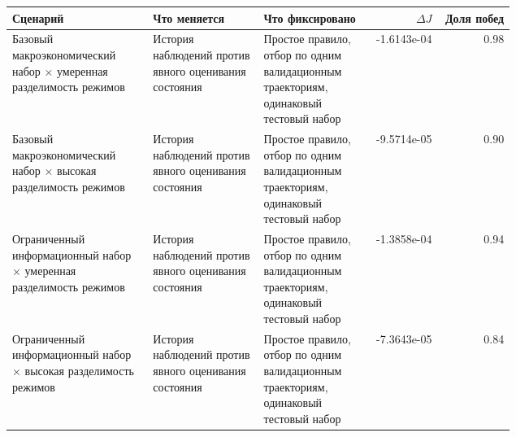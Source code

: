 \begin{tabular}{p{0.28\linewidth}p{0.22\linewidth}p{0.22\linewidth}rr}
\toprule
Сценарий & Что меняется & Что фиксировано & $\Delta J$ & Доля побед \\
\midrule
Базовый макроэкономический набор × умеренная разделимость режимов & История наблюдений против явного оценивания состояния & Простое правило, отбор по одним валидационным траекториям, одинаковый тестовый набор & -1.6143e-04 & 0.98 \\
Базовый макроэкономический набор × высокая разделимость режимов & История наблюдений против явного оценивания состояния & Простое правило, отбор по одним валидационным траекториям, одинаковый тестовый набор & -9.5714e-05 & 0.90 \\
Ограниченный информационный набор × умеренная разделимость режимов & История наблюдений против явного оценивания состояния & Простое правило, отбор по одним валидационным траекториям, одинаковый тестовый набор & -1.3858e-04 & 0.94 \\
Ограниченный информационный набор × высокая разделимость режимов & История наблюдений против явного оценивания состояния & Простое правило, отбор по одним валидационным траекториям, одинаковый тестовый набор & -7.3643e-05 & 0.84 \\
\bottomrule
\end{tabular}